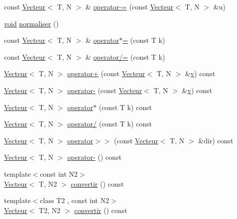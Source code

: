 \begin{DoxyCompactItemize}
\item 
const \hyperlink{class_vecteur}{Vecteur}$<$ T, N $>$ \& \hyperlink{class_vecteur_aa008838f93deafba755a4d3c52975d9b}{operator-\/=} (const \hyperlink{class_vecteur}{Vecteur}$<$ T, N $>$ \&u)
\item 
\hyperlink{wglew_8h_aeea6e3dfae3acf232096f57d2d57f084}{void} \hyperlink{class_vecteur_aaeb288e1b305145341bca772cd1d572f}{normaliser} ()
\item 
const \hyperlink{class_vecteur}{Vecteur}$<$ T, N $>$ \& \hyperlink{class_vecteur_ac8583c8d7bb0160ecde65ae1bcb25f32}{operator$\ast$=} (const T k)
\item 
const \hyperlink{class_vecteur}{Vecteur}$<$ T, N $>$ \& \hyperlink{class_vecteur_afef2e22b6a9a8b0ae76dfbf430644ed7}{operator/=} (const T k)
\item 
\hyperlink{class_vecteur}{Vecteur}$<$ T, N $>$ \hyperlink{class_vecteur_a9e0176d2ba6309bdd1f1a4507f42e95a}{operator+} (const \hyperlink{class_vecteur}{Vecteur}$<$ T, N $>$ \&\hyperlink{glew_8h_a6509431814422c215a65946289dd98b8}{v}) const 
\item 
\hyperlink{class_vecteur}{Vecteur}$<$ T, N $>$ \hyperlink{class_vecteur_a27e5c7511ade885e14b5d3ec391f0e94}{operator-\/} (const \hyperlink{class_vecteur}{Vecteur}$<$ T, N $>$ \&\hyperlink{glew_8h_a6509431814422c215a65946289dd98b8}{v}) const 
\item 
\hyperlink{class_vecteur}{Vecteur}$<$ T, N $>$ \hyperlink{class_vecteur_aaad0e8809c51aa00578c756eb18e28b9}{operator$\ast$} (const T k) const 
\item 
\hyperlink{class_vecteur}{Vecteur}$<$ T, N $>$ \hyperlink{class_vecteur_a0774ec943baa91dc506693a3fb9c1bff}{operator/} (const T k) const 
\item 
\hyperlink{class_vecteur}{Vecteur}$<$ T, N $>$ \hyperlink{class_vecteur_a94815bbd743aa7c282ff1c4d509c4c27}{operator$>$$>$} (const \hyperlink{class_vecteur}{Vecteur}$<$ T, N $>$ \&dir) const 
\item 
\hyperlink{class_vecteur}{Vecteur}$<$ T, N $>$ \hyperlink{class_vecteur_a9749c692393d634fac9ebf663a261a19}{operator-\/} () const 
\item 
{\footnotesize template$<$const int N2$>$ }\\\hyperlink{class_vecteur}{Vecteur}$<$ T, N2 $>$ \hyperlink{class_vecteur_a06c3800145756744698c41603078d0a4}{convertir} () const 
\item 
{\footnotesize template$<$class T2 , const int N2$>$ }\\\hyperlink{class_vecteur}{Vecteur}$<$ T2, N2 $>$ \hyperlink{class_vecteur_a5fe93e22709412c575e369b6295549d5}{convertir} () const 
\end{DoxyCompactItemize}
